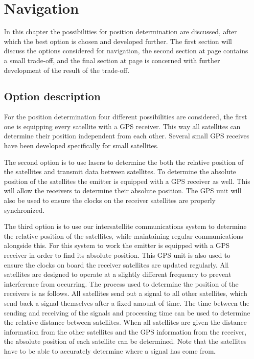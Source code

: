 \section{Navigation}
\label{NaviReceiver}
In this chapter the possibilities for position determination are discussed, after which the best option is chosen and developed further. The first section will discuss the options considered for navigation, the second section at page \pageref{navi2} contains a small trade-off, and the final section at page \pageref{navi3} is concerned with further development of the result of the trade-off.

\subsection{Option description}
\label{navi1}
For the position determination four different possibilities are considered, the first one is equipping every satellite with a \acs{GPS} receiver. This way all satellites can determine their position independent from each other. Several small \acs{GPS} receives have been developed specifically for small satellites.

The second option is to use lasers to determine the both the relative position of the satellites and transmit data between satellites. To determine the absolute position of the satellites the emitter is equipped with a \acs{GPS} receiver as well. This will allow the receivers to determine their absolute position. The \acs{GPS} unit will also be used to ensure the clocks on the receiver satellites are properly synchronized.

The third option is to use our intersatellite communications system to determine the relative position of the satellites, while maintaining regular communications alongside this. For this system to work the emitter is equipped with a GPS receiver in order to find its absolute position. This GPS unit is also used to ensure the clocks on board the receiver satellites are updated regularly. All satellites are designed to operate at a slightly different frequency to prevent interference from occurring. 
The process used to determine the position of the receivers is as follows. All satellites send out a signal to all other satellites, which send back a signal themselves after a fixed amount of time. The time between the sending and receiving of the signals and processing time can be used to determine the relative distance between satellites. When all satellites are given the distance information from the other satellites and the GPS information from the receiver, the absolute position of each satellite can be determined. Note that the satellites have to be able to accurately determine where a signal has come from.

